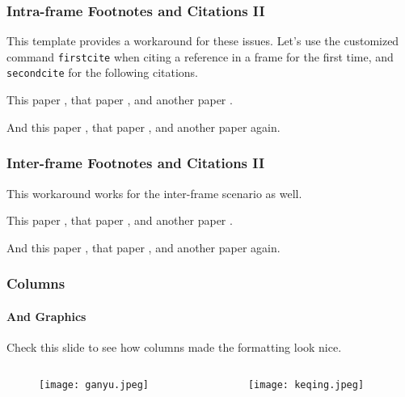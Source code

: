 \begin{frame}
    \frametitle{Intra-frame Footnotes and Citations II}
    
    This template provides a workaround for these issues. 
    Let's use the customized command \texttt{firstcite} when citing a reference in a frame for the first time, and \texttt{secondcite} for the following citations. \newline

    This paper , that paper , and another paper . \newline

    And this paper , that paper , and another paper  again. 
\end{frame}

\begin{frame}
    \frametitle{Inter-frame Footnotes and Citations II}

    This workaround works for the inter-frame scenario as well. \newline

    This paper , that paper , and another paper . \newline

    And this paper , that paper , and another paper  again. 
\end{frame}

\begin{frame}
    \frametitle{Columns}
    \framesubtitle{And Graphics}

    Check this slide to see how columns made the formatting look nice.

    \begin{columns}[t] %
        \begin{column}{0.5\textwidth} %
            \begin{figure}[h!]
                \centering
                \texttt{[image: ganyu.jpeg]}
                \label{Figure 1}
            \end{figure}
        \end{column}
        \begin{column}{0.5\textwidth} %
            \begin{figure}[h!]
                \centering
                \texttt{[image: keqing.jpeg]}
                \label{Figure 2}
            \end{figure}
        \end{column}
    \end{columns}
\end{frame}

